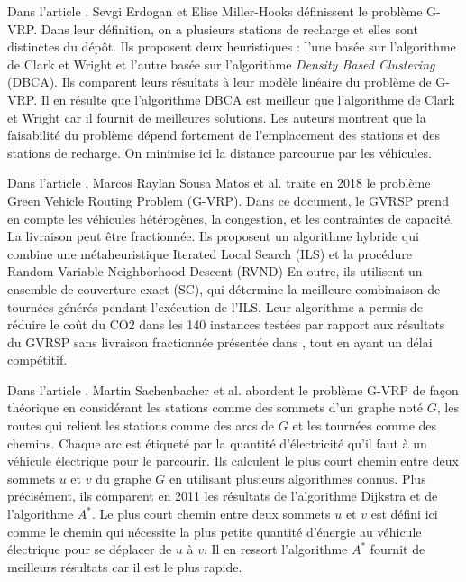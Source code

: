  Dans l'article \cite{article_GVRP2}, Sevgi Erdogan et Elise Miller-Hooks définissent le problème G-VRP. Dans leur définition, on a plusieurs stations de recharge et elles sont distinctes du dépôt. Ils proposent deux heuristiques : l'une basée sur l'algorithme de Clark et Wright et l'autre basée sur l'algorithme \textit{Density Based Clustering} (DBCA). Ils comparent leurs résultats à leur modèle linéaire du problème de G-VRP. Il en résulte que l'algorithme DBCA est meilleur que l'algorithme de Clark et Wright car il fournit de meilleures solutions. Les auteurs montrent que la faisabilité du problème dépend fortement de l'emplacement des stations et des stations de recharge. On minimise ici la distance parcourue par les véhicules.

Dans l'article \cite{article_GVRP9}, Marcos Raylan Sousa Matos et al. traite en 2018 le problème Green Vehicle Routing Problem (G-VRP). Dans ce document, le GVRSP prend en compte les véhicules hétérogènes, la congestion, et les contraintes de capacité. La livraison peut être fractionnée. Ils proposent un algorithme hybride qui combine une métaheuristique Iterated Local Search (ILS) et la procédure Random Variable Neighborhood Descent (RVND) En outre, ils utilisent un ensemble de couverture exact (SC), qui détermine la meilleure combinaison de tournées générés pendant l'exécution de l'ILS. Leur algorithme a permis de réduire le coût du CO2 dans les 140 instances testées par rapport aux résultats du GVRSP sans livraison fractionnée présentée dans \cite{Xiao_heterogeneous_2016}, tout en ayant un délai compétitif.

Dans l'article \cite{article_GVRP4}, Martin Sachenbacher et al. abordent le problème G-VRP de façon théorique en considérant les stations comme des sommets d'un graphe noté $G$, les routes qui relient les stations comme des arcs de $G$ et les tournées comme des chemins. Chaque arc est étiqueté par la quantité d'électricité qu'il faut à un véhicule électrique pour le parcourir. Ils calculent le plus court chemin entre deux sommets $u$ et $v$ du graphe $G$ en utilisant plusieurs algorithmes connus. Plus précisément, ils comparent en 2011 les résultats de l'algorithme Dijkstra et de l'algorithme $A^*$. Le plus court chemin entre deux sommets $u$ et $v$ est défini ici comme le chemin qui nécessite la plus petite quantité d'énergie au véhicule électrique pour se déplacer de $u$ à $v$. Il en ressort l'algorithme $A^*$ fournit de meilleurs résultats car il est le plus rapide.

